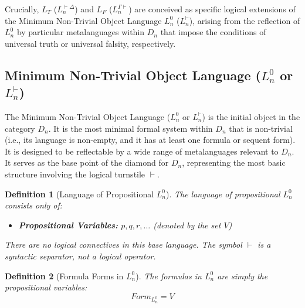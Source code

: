 \documentclass{article}
\newtheorem{definition}{Definition}[section] %
\newcommand{\LT}{L_T} %
\newcommand{\LF}{L_F} %
\begin{document}
																	Crucially, $\LT$ ($L^{\vdash\Delta}_n$) and $\LF$ ($L^{\Gamma\vdash}_n$) are conceived as specific logical extensions of the Minimum Non-Trivial Object Language $L^0_n$ ($L^{\vdash}_n$), arising from the reflection of $L^0_n$ by particular metalanguages within $D_n$ that impose the conditions of universal truth or universal falsity, respectively.
																	
																	\subsection{Minimum Non-Trivial Object Language ($L^0_n$ or $L^{\vdash}_n$)}
																	
																	The Minimum Non-Trivial Object Language ($L^0_n$ or $L^{\vdash}_n$) is the initial object in the category $D_n$. It is the most minimal formal system within $D_n$ that is non-trivial (i.e., its language is non-empty, and it has at least one formula or sequent form). It is designed to be reflectable by a wide range of metalanguages relevant to $D_n$. It serves as the base point of the diamond for $D_n$, representing the most basic structure involving the logical turnstile $\vdash$.
																	
																	\begin{definition}[Language of Propositional $L^0_n$]
																		The language of propositional $L^0_n$ consists only of:
																		\begin{itemize}
																			\item \textbf{Propositional Variables:} $p, q, r, \dots$ (denoted by the set $V$)
																			\end{itemize}
																				There are no logical connectives in this base language. The symbol $\vdash$ is a syntactic separator, not a logical operator.
																				\end{definition}
																					
																					\begin{definition}[Formula Forms in $L^0_n$]
																						The formulas in $L^0_n$ are simply the propositional variables:
																						$$Form_{L^0_n} = V$$
																						\end{definition}
																							
\end{document}
